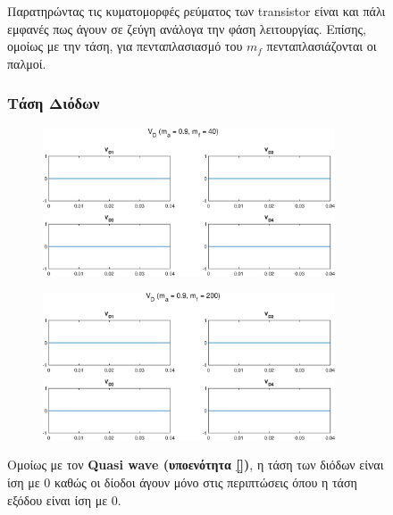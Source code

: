 \begin{figure}[h!]
\begin{subfigure}{0.49\textwidth}
	\end{subfigure}
\noindent
Παρατηρώντας τις κυματομορφές ρεύματος των transistor είναι και πάλι εμφανές πως άγουν σε ζεύγη ανάλογα την φάση λειτουργίας. Επίσης, ομοίως με την τάση, για πενταπλασιασμό του $m_f$ πενταπλασιάζονται οι παλμοί.
\end{figure}

\begin{figure}[h!]
	\subsubsection*{Τάση Διόδων}
	\begin{subfigure}{0.49\textwidth}
		\centering
		\includegraphics[width=0.95\textwidth]{Images/V_D_40}
	\end{subfigure}
	\begin{subfigure}{0.49\textwidth}
		\centering
		\includegraphics[width=0.95\textwidth]{Images/V_D_200}
	\end{subfigure}
	\noindent
	Ομοίως με τον \textbf{Quasi wave (υποενότητα \ref{})}, η τάση των διόδων είναι ίση με 0 καθώς οι δίοδοι άγουν μόνο στις περιπτώσεις όπου η τάση εξόδου είναι ίση με 0.
\end{figure}

